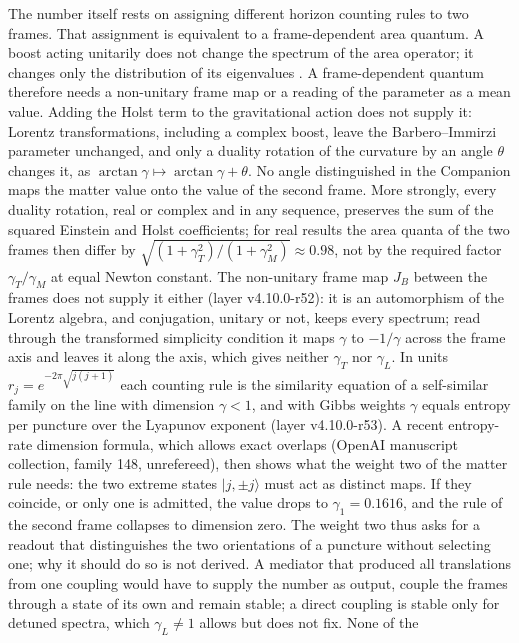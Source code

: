 The number itself rests on assigning different horizon counting rules
to two frames. That assignment is equivalent to a frame-dependent area
quantum. A boost acting unitarily does not change the spectrum of the
area operator; it changes only the distribution of its eigenvalues
\cite{RovelliSpeziale2003}. A frame-dependent quantum therefore needs a
non-unitary frame map or a reading of the parameter as a mean value.
Adding the Holst term to the gravitational action does not supply it:
Lorentz transformations, including a complex boost, leave the
Barbero--Immirzi parameter unchanged, and only a duality rotation of
the curvature by an angle $\theta$ changes it, as
$\arctan\gamma\mapsto\arctan\gamma+\theta$. No angle distinguished in
the Companion maps the matter value onto the value of the second frame.
More strongly, every duality rotation, real or complex and in any
sequence, preserves the sum of the squared Einstein and Holst
coefficients; for real results the area quanta of the two frames then
differ by $\sqrt{(1+\gamma_T^2)/(1+\gamma_M^2)}\approx0.98$, not by
the required factor $\gamma_T/\gamma_M$ at equal Newton constant.
The non-unitary frame map $J_B$ between the frames does not supply it
either (layer v4.10.0-r52): it is an automorphism of the Lorentz
algebra, and conjugation, unitary or not, keeps every spectrum; read
through the transformed simplicity condition it maps $\gamma$ to $-1/\gamma$
across the frame axis and leaves it along the axis, which gives neither
$\gamma_T$ nor $\gamma_L$.
In units $r_j=e^{-2\pi\sqrt{j(j+1)}}$ each counting rule is the similarity
equation of a self-similar family on the line with dimension $\gamma<1$,
and with Gibbs weights $\gamma$ equals entropy per puncture over the
Lyapunov exponent (layer v4.10.0-r53). A recent entropy-rate dimension
formula, which allows exact overlaps (OpenAI manuscript collection,
family 148, unrefereed), then shows what the weight two of
the matter rule needs: the two extreme states $|j,\pm j\rangle$ must act as
distinct maps. If they coincide, or only one is admitted, the value drops
to $\gamma_1=0.1616$, and the rule of the second frame collapses to
dimension zero. The weight two thus asks for a readout that distinguishes
the two orientations of a puncture without selecting one; why it should
do so is not derived.
A mediator that produced all translations from one coupling would have
to supply the number as output, couple the frames through a state of
its own and remain stable; a direct coupling is stable only for detuned
spectra, which $\gamma_L\neq1$ allows but does not fix. None of the
